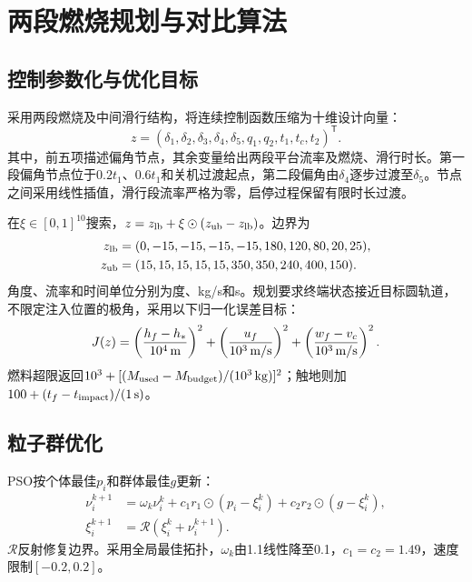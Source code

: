 \section{两段燃烧规划与对比算法}
\subsection{控制参数化与优化目标}
采用两段燃烧及中间滑行结构，将连续控制函数压缩为十维设计向量：
\begin{equation}z=(\delta_1,\delta_2,\delta_3,\delta_4,\delta_5,q_1,q_2,t_1,t_c,t_2)^{\mathsf T}.\end{equation}
其中，前五项描述偏角节点，其余变量给出两段平台流率及燃烧、滑行时长。第一段偏角节点位于$0.2t_1$、$0.6t_1$和关机过渡起点，第二段偏角由$\delta_4$逐步过渡至$\delta_5$。节点之间采用线性插值，滑行段流率严格为零，启停过程保留有限时长过渡。

在$\xi\in[0,1]^{10}$搜索，$z=z_{\rm lb}+\xi\odot(z_{\rm ub}-z_{\rm lb})$。边界为
\begin{equation}
\begin{aligned}
z_{\rm lb}&=(0,-15,-15,-15,-15,180,120,80,20,25),\\
z_{\rm ub}&=(15,15,15,15,15,350,350,240,400,150).
\end{aligned}
\end{equation}
角度、流率和时间单位分别为度、kg/s和s。规划要求终端状态接近目标圆轨道，不限定注入位置的极角，采用以下归一化误差目标：
\begin{equation}
J(z)=\left(\frac{h_f-h_*}{10^4\,{\rm m}}\right)^2+
\left(\frac{u_f}{10^3\,{\rm m/s}}\right)^2+
\left(\frac{w_f-v_c}{10^3\,{\rm m/s}}\right)^2.\label{eq:J}
\end{equation}
燃料超限返回$10^3+[(M_{\rm used}-M_{\rm budget})/(10^3\,{\rm kg})]^2$；触地则加$100+(t_f-t_{\rm impact})/(1\,{\rm s})$。

\subsection{粒子群优化}
PSO按个体最佳$p_i$和群体最佳$g$更新\cite{kennedy1995pso}：
\begin{equation}
\begin{aligned}
\nu_i^{k+1}&=\omega_k\nu_i^k+c_1r_1\odot(p_i-\xi_i^k)+c_2r_2\odot(g-\xi_i^k),\\
\xi_i^{k+1}&=\mathcal R(\xi_i^k+\nu_i^{k+1}).
\end{aligned}
\end{equation}
$\mathcal R$反射修复边界。采用全局最佳拓扑，$\omega_k$由1.1线性降至0.1，$c_1=c_2=1.49$，速度限制$[-0.2,0.2]$。

